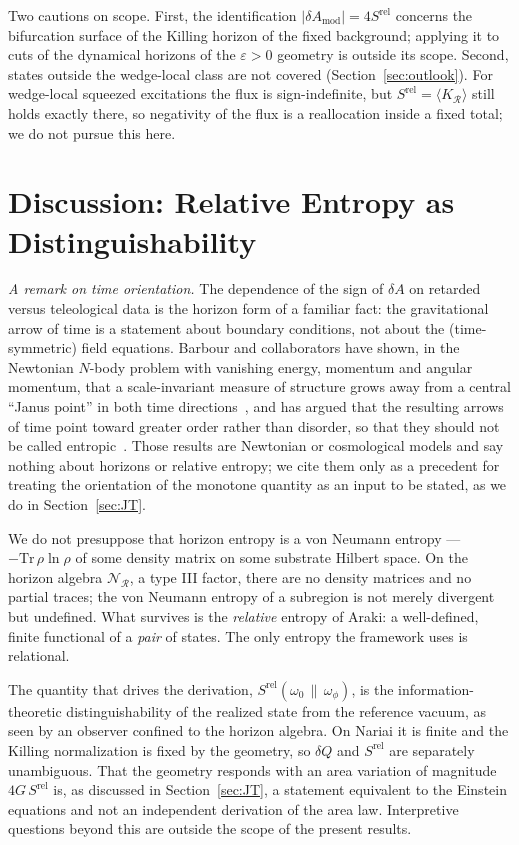 \documentclass[11pt]{article}
\newcommand{\Srel}{S^{\mathrm{rel}}}
\begin{document}
Two cautions on scope. First, the identification $|\delta A_{\mathrm{mod}}|=4\Srel$ concerns the bifurcation surface of the Killing horizon of the fixed background; applying it to cuts of the dynamical horizons of the $\varepsilon>0$ geometry is outside its scope. Second, states outside the wedge-local class are not covered (Section~\ref{sec:outlook}). For wedge-local squeezed excitations the flux is sign-indefinite, but $\Srel=\langle K_{\mathcal R}\rangle$ still holds exactly there, so negativity of the flux is a reallocation inside a fixed total; we do not pursue this here.

\section{Discussion: Relative Entropy as Distinguishability}

\noindent\emph{A remark on time orientation.} The dependence of the sign of $\delta A$ on retarded versus teleological data is the horizon form of a familiar fact: the gravitational arrow of time is a statement about boundary conditions, not about the (time-symmetric) field equations. Barbour and collaborators have shown, in the Newtonian $N$-body problem with vanishing energy, momentum and angular momentum, that a scale-invariant measure of structure grows away from a central ``Janus point'' in both time directions~\cite{BarbourLobo,BarbourLourenco}, and has argued that the resulting arrows of time point toward greater order rather than disorder, so that they should not be called entropic~\cite{BarbourEntropy}. Those results are Newtonian or cosmological models and say nothing about horizons or relative entropy; we cite them only as a precedent for treating the orientation of the monotone quantity as an input to be stated, as we do in Section~\ref{sec:JT}.
\label{sec:discussion}

We do not presuppose that horizon entropy is a von Neumann entropy --- $-\mathrm{Tr}\,\rho\ln\rho$ of some density matrix on some substrate Hilbert space. On the horizon algebra $\mathscr{N}_{\mathcal{R}}$, a type III factor, there are no density matrices and no partial traces; the von Neumann entropy of a subregion is not merely divergent but undefined. What survives is the \emph{relative} entropy of Araki: a well-defined, finite functional of a \emph{pair} of states. The only entropy the framework uses is relational.

The quantity that drives the derivation, $\Srel(\omega_0\,\|\,\omega_\phi)$, is the information-theoretic distinguishability of the realized state from the reference vacuum, as seen by an observer confined to the horizon algebra. On Nariai it is finite and the Killing normalization is fixed by the geometry, so $\delta Q$ and $\Srel$ are separately unambiguous. That the geometry responds with an area variation of magnitude $4G\,\Srel$ is, as discussed in Section~\ref{sec:JT}, a statement equivalent to the Einstein equations and not an independent derivation of the area law. Interpretive questions beyond this are outside the scope of the present results.
\end{document}
